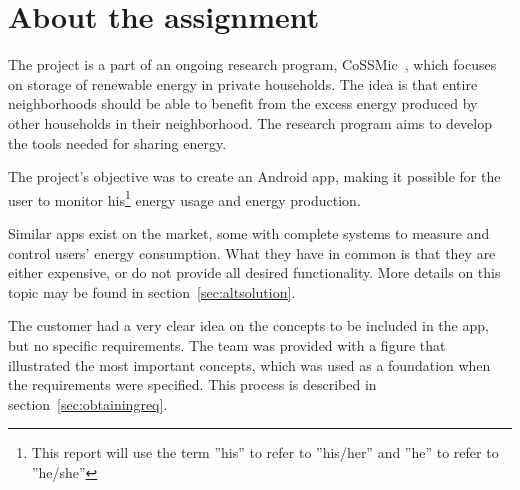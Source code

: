 \section{About the assignment}

The project is a part of an ongoing research program, CoSSMic~\cite{cossmic}, which focuses on storage of renewable energy in private households. 
The idea is that entire neighborhoods should be able to benefit from the excess energy produced by other households in their neighborhood. 
The research program aims to develop the tools needed for sharing energy. 

The project's objective was to create an Android \gls{app}, making it possible for the user to monitor his\footnote{This report will use the term ''his'' to refer to ''his/her'' and ''he'' to refer to ''he/she''} 
energy usage and energy production. 

Similar apps exist on the market, some with complete systems to measure and control users' energy consumption. 
What they have in common is that they are either expensive, or do not provide all desired functionality. More details on this topic may be found in section~\ref{sec:altsolution}.

The customer had a very clear idea on the concepts to be included in the app, but no specific requirements. The team was provided with a figure that illustrated the most important concepts, which was used as a foundation when the requirements were specified. 
This process is described in section~\ref{sec:obtainingreq}.